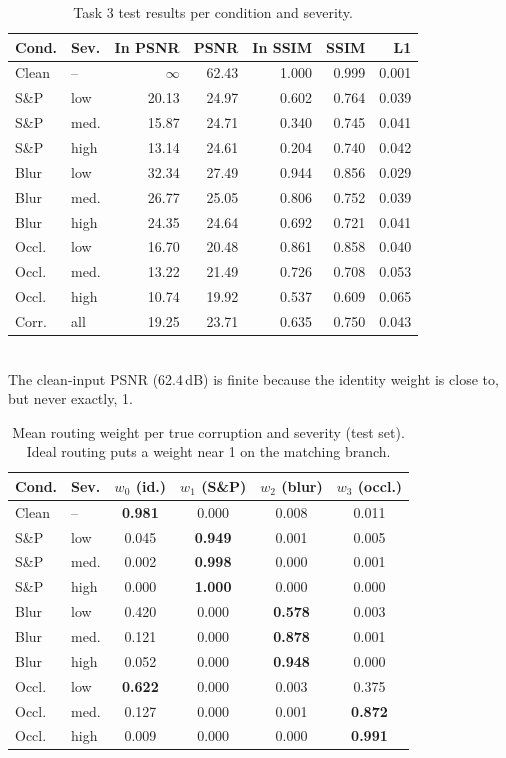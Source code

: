 \documentclass[conference]{IEEEtran}
\begin{document}
\begin{table}[t]
\centering
\caption{Task 3 test results per condition and severity.}
\label{tab:task3_results}
\scriptsize
\setlength{\tabcolsep}{3pt}
\begin{tabular}{llrrrrr}
\toprule
Cond. & Sev. & In PSNR & PSNR & In SSIM & SSIM & L1 \\
\midrule
Clean & --   & $\infty$ & 62.43 & 1.000 & 0.999 & 0.001 \\
S\&P  & low  & 20.13 & 24.97 & 0.602 & 0.764 & 0.039 \\
S\&P  & med. & 15.87 & 24.71 & 0.340 & 0.745 & 0.041 \\
S\&P  & high & 13.14 & 24.61 & 0.204 & 0.740 & 0.042 \\
Blur  & low  & 32.34 & 27.49 & 0.944 & 0.856 & 0.029 \\
Blur  & med. & 26.77 & 25.05 & 0.806 & 0.752 & 0.039 \\
Blur  & high & 24.35 & 24.64 & 0.692 & 0.721 & 0.041 \\
Occl. & low  & 16.70 & 20.48 & 0.861 & 0.858 & 0.040 \\
Occl. & med. & 13.22 & 21.49 & 0.726 & 0.708 & 0.053 \\
Occl. & high & 10.74 & 19.92 & 0.537 & 0.609 & 0.065 \\
\midrule
Corr. & all & 19.25 & 23.71 & 0.635 & 0.750 & 0.043 \\
\bottomrule
\end{tabular}
\\[3pt]
The clean-input PSNR (62.4\,dB) is finite because the identity weight is
close to, but never exactly, 1.
\end{table}

\begin{table}[t]
\centering
\caption{Mean routing weight per true corruption and severity (test set).
Ideal routing puts a weight near 1 on the matching branch.}
\label{tab:task3_weights}
\scriptsize
\setlength{\tabcolsep}{4pt}
\begin{tabular}{llcccc}
\toprule
Cond. & Sev. & $w_0$ (id.) & $w_1$ (S\&P) & $w_2$ (blur) & $w_3$ (occl.) \\
\midrule
Clean & --   & \textbf{0.981} & 0.000 & 0.008 & 0.011 \\
S\&P  & low  & 0.045 & \textbf{0.949} & 0.001 & 0.005 \\
S\&P  & med. & 0.002 & \textbf{0.998} & 0.000 & 0.001 \\
S\&P  & high & 0.000 & \textbf{1.000} & 0.000 & 0.000 \\
Blur  & low  & 0.420 & 0.000 & \textbf{0.578} & 0.003 \\
Blur  & med. & 0.121 & 0.000 & \textbf{0.878} & 0.001 \\
Blur  & high & 0.052 & 0.000 & \textbf{0.948} & 0.000 \\
Occl. & low  & \textbf{0.622} & 0.000 & 0.003 & 0.375 \\
Occl. & med. & 0.127 & 0.000 & 0.001 & \textbf{0.872} \\
Occl. & high & 0.009 & 0.000 & 0.000 & \textbf{0.991} \\
\bottomrule
\end{tabular}
\\[3pt]
\end{table}
\end{document}
